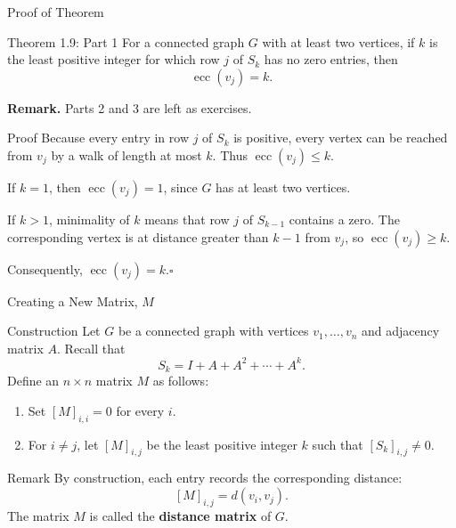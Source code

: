 \documentclass[aspectratio=169,11pt]{beamer}
\begin{document}
\begin{frame}[t]{Proof of Theorem}
\begin{block}{Theorem 1.9: Part 1}
For a connected graph $G$ with at least two vertices, if $k$ is the least positive integer for which row $j$ of $S_k$ has no zero entries, then
\[
\operatorname{ecc}(v_j)=k.
\]
\end{block}

\smallskip
\textbf{Remark.} Parts 2 and 3 are left as exercises.

\begin{block}{Proof}
\small
Because every entry in row $j$ of $S_k$ is positive, every vertex can be reached from $v_j$ by a walk of length at most $k$. Thus
$\operatorname{ecc}(v_j)\leq k$.

\smallskip
If $k=1$, then $\operatorname{ecc}(v_j)=1$, since $G$ has at least two vertices.

\smallskip
If $k>1$, minimality of $k$ means that row $j$ of $S_{k-1}$ contains a zero. The corresponding vertex is at distance greater than $k-1$ from $v_j$, so $\operatorname{ecc}(v_j)\geq k$.

\smallskip
Consequently, $\operatorname{ecc}(v_j)=k$.\hfill$\square$
\end{block}
\end{frame}


\begin{frame}[t]{Creating a New Matrix, $M$}
\begin{block}{Construction}
\small
Let $G$ be a connected graph with vertices $v_1,\ldots,v_n$ and adjacency matrix $A$. Recall that
\[
S_k=I+A+A^2+\cdots+A^k.
\]
Define an $n\times n$ matrix $M$ as follows:
\begin{enumerate}
\setlength{\itemsep}{0.25cm}
\item Set $[M]_{i,i}=0$ for every $i$.
\item For $i\neq j$, let $[M]_{i,j}$ be the least positive integer $k$ such that $[S_k]_{i,j}\neq 0$.
\end{enumerate}
\end{block}

\vspace{0.05cm}
\begin{block}{Remark}
By construction, each entry records the corresponding distance:
\[
[M]_{i,j}=d(v_i,v_j).
\]
The matrix $M$ is called the \textbf{distance matrix} of $G$.
\end{block}
\end{frame}
\end{document}
